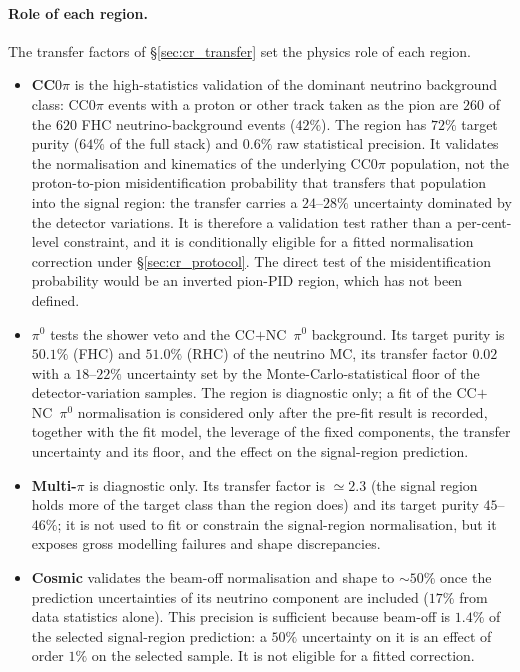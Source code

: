 \documentclass[11pt,a4paper]{article}
\begin{document}
\paragraph{Role of each region.} The transfer factors of \S\ref{sec:cr_transfer} set
the physics role of each region.
\begin{itemize}\itemsep2pt
  \item \textbf{CC$0\pi$} is the high-statistics validation of the dominant neutrino
    background class: CC$0\pi$ events with a proton or other track taken as the pion are
    $260$ of the $620$ FHC neutrino-background events ($42\%$). The region has $72\%$
    target purity ($64\%$ of the full stack) and $0.6\%$ raw statistical precision. It
    validates the normalisation and kinematics of the underlying CC$0\pi$ population,
    not the proton-to-pion misidentification probability that transfers that
    population into the signal region: the transfer carries a $24$--$28\%$ uncertainty
    dominated by the detector variations. It is therefore a validation test rather than
    a per-cent-level constraint, and it is conditionally eligible for a fitted
    normalisation correction under \S\ref{sec:cr_protocol}. The direct test of the
    misidentification probability would be an inverted pion-PID region, which has not been
    defined.
  \item \textbf{$\pi^0$} tests the shower veto and the CC$+$NC~$\pi^0$ background. Its
    target purity is $50.1\%$ (FHC) and $51.0\%$ (RHC) of the neutrino MC, its transfer
    factor $0.02$ with a $18$--$22\%$ uncertainty set by the Monte-Carlo-statistical
    floor of the detector-variation samples. The region is diagnostic only; a fit of the
    CC$+$NC~$\pi^0$ normalisation is considered only after the pre-fit result is recorded,
    together with the fit model, the leverage of the fixed components, the transfer
    uncertainty and its floor, and the effect on the signal-region prediction.
  \item \textbf{Multi-$\pi$} is diagnostic only. Its transfer factor is $\simeq2.3$
    (the signal region holds more of the target class than the region does) and its
    target purity $45$--$46\%$; it is not used to fit or constrain the signal-region
    normalisation, but it exposes gross modelling failures and shape discrepancies.
  \item \textbf{Cosmic} validates the beam-off normalisation and shape to $\sim\!50\%$
    once the prediction uncertainties of its neutrino component are included ($17\%$
    from data statistics alone). This precision is sufficient because beam-off is $1.4\%$ of the
    selected signal-region prediction: a $50\%$ uncertainty on it is an effect of order
    $1\%$ on the selected sample. It is not eligible for a fitted correction.
\end{itemize}
\end{document}
